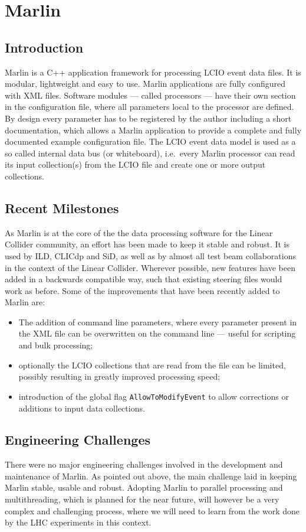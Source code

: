 \section{Marlin}

\subsection{Introduction}
Marlin\cite{Gaede2006177} is a C++ application framework for processing LCIO event data files. It is modular, lightweight and easy to use. Marlin applications are fully configured with XML files. Software modules --- called processors --- have their own section in the configuration file, where all parameters local to the processor are defined. By design every parameter has to be registered by the author including a short documentation, which allows a Marlin application to provide a complete and fully documented example configuration file. The LCIO event data model is used as a so called internal data bus (or whiteboard), i.e.\ every Marlin processor can read its input collection(s) from the LCIO file and create one or more output collections.

\subsection{Recent Milestones}
As Marlin is at the core of the the data processing software for the Linear Collider community, an effort has been made to keep it stable and robust. It is used by ILD, CLICdp and SiD, as well as by almost all test beam collaborations in the context of the Linear Collider. Wherever possible, new features have been added in a backwards compatible way, such that existing steering files would work as before. Some of the improvements that have been recently added to Marlin are:
\begin{itemize}
	\item The addition of command line parameters, where every parameter present in the XML file can be overwritten on the command line --- useful for scripting and bulk processing;
	\item optionally the LCIO collections that are read from the file can be limited, possibly resulting in greatly improved processing speed;
	\item introduction of the global flag \texttt{AllowToModifyEvent} to allow corrections or additions to input data collections.
\end{itemize}

\subsection{Engineering Challenges}
There were no major engineering challenges involved in the development and maintenance of Marlin. As pointed out above, the main challenge laid in keeping Marlin stable, usable and robust. Adopting Marlin to parallel processing and multithreading, which is planned for the near future, will however be a very complex and challenging process, where we will need to learn from the work done by the LHC experiments in this context.


